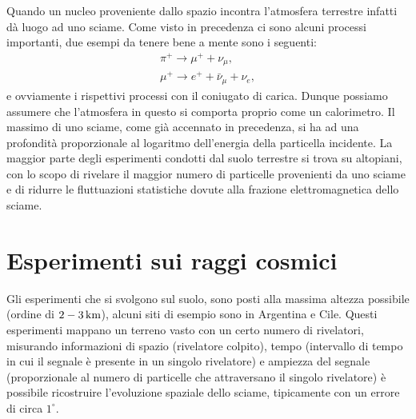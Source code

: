 Quando un nucleo proveniente dallo spazio incontra l'atmosfera terrestre infatti dà luogo ad uno sciame. Come visto in precedenza ci sono alcuni processi importanti, due esempi da tenere bene a mente sono i seguenti:
\begin{gather*}
    \pi^{+} \rightarrow \mu^+ + \nu_\mu, \\
    \mu^+   \rightarrow e^+ + \bar{\nu}_\mu + \nu_e,
\end{gather*}
e ovviamente i rispettivi processi con il coniugato di carica. Dunque possiamo assumere che l'atmosfera in questo si comporta proprio come un calorimetro. Il massimo di uno sciame, come già accennato in precedenza, si ha ad una profondità proporzionale al logaritmo dell'energia della particella incidente. La maggior parte degli esperimenti condotti dal suolo terrestre si trova su altopiani, con lo scopo di rivelare il maggior numero di particelle provenienti da uno sciame e di ridurre le fluttuazioni statistiche dovute alla frazione elettromagnetica dello sciame.

\section{Esperimenti sui raggi cosmici}

Gli esperimenti che si svolgono sul suolo, sono posti alla massima altezza possibile (ordine di $2-3\,\textup{km}$), alcuni siti di esempio sono in Argentina e Cile. Questi esperimenti mappano un terreno vasto con un certo numero di rivelatori, misurando informazioni di spazio (rivelatore colpito), tempo (intervallo di tempo in cui il segnale è presente in un singolo rivelatore) e ampiezza del segnale (proporzionale al numero di particelle che attraversano il singolo rivelatore) è possibile ricostruire l'evoluzione spaziale dello sciame, tipicamente con un errore di circa $1^\circ$.

